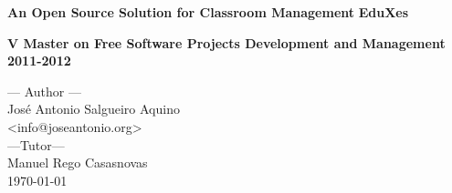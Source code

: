\documentclass[twoside,a4paper,12pt]{book}
\begin{document}
\renewcommand{\captionlabelfont}{\textbf}

\pagestyle{fancy}

\fancyhf{}
%
\renewcommand{\headrulewidth}{0.5pt}

\fancyhead[LO]{\rightmark} %

\fancyhead[RE]{\leftmark} %

\fancyhead[RO,LE]{\thepage} %
%

\thispagestyle{empty}

\baselineskip

\vspace{2cm}

\begin{center}

%
\vspace{5mm}

%

%
\vspace{4.5cm}
%
%
%

{\Large {\bf An Open Source Solution for Classroom Management}}
\vspace{0.5cm}
{\Large {\bf EduXes}}
\vspace{3cm}

%
{\large {\bf 
V Master on Free Software Projects Development and Management 2011-2012}}
%
%
\vspace{4cm}


--- Author --- \\

Jos\'e Antonio Salgueiro Aquino \\

 <info@joseantonio.org> \\
\vspace{1cm}
---Tutor---\\ 
Manuel Rego Casasnovas\\
\vspace{1cm} \today

%
\end{center}
\newpage{\pagestyle{empty}\cleardoublepage}
\end{document}
